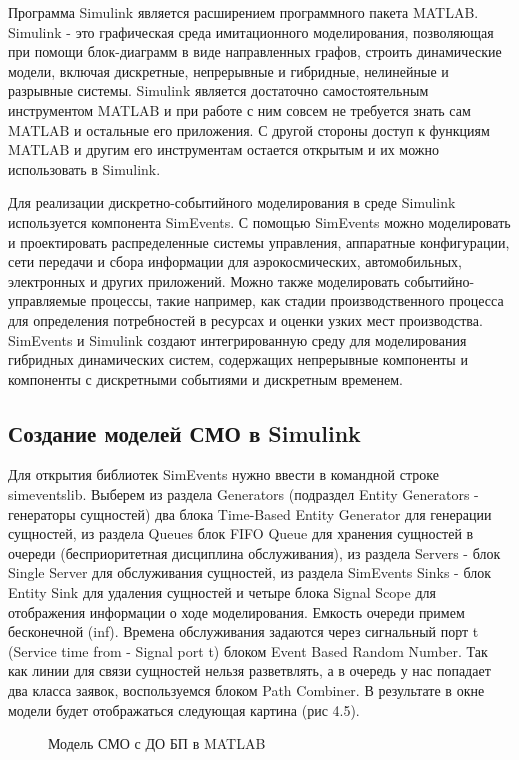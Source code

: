 \documentclass[a4paper,14pt]{report} %
\begin{document}
Программа Simulink является расширением программного пакета MATLAB. Simulink - это графическая среда имитационного моделирования, позволяющая при помощи блок-диаграмм в виде направленных графов, строить динамические модели, включая дискретные, непрерывные и гибридные, нелинейные и разрывные системы. Simulink является достаточно самостоятельным инструментом MATLAB и при работе с ним совсем не требуется знать сам MATLAB и остальные его приложения. С другой стороны доступ к функциям MATLAB и другим его инструментам остается открытым и их можно использовать в Simulink. 

Для реализации дискретно-событийного моделирования в среде Simulink используется компонента SimEvents. С помощью SimEvents можно моделировать и проектировать распределенные системы управления, аппаратные конфигурации, сети передачи и сбора информации для аэрокосмических, автомобильных, электронных и других приложений. Можно также моделировать событийно-управляемые процессы, такие например, как стадии производственного процесса для определения потребностей в ресурсах и оценки узких мест производства. SimEvents и Simulink создают интегрированную среду для моделирования гибридных динамических систем, содержащих непрерывные компоненты и компоненты с дискретными событиями и дискретным временем. 

\subsection{Создание моделей СМО в Simulink}
Для открытия библиотек SimEvents нужно ввести в командной строке simeventslib. Выберем из раздела Generators (подраздел Entity Generators - генераторы сущностей) два блока Time-Based Entity Generator для генерации сущностей, из раздела Queues блок FIFO Queue для хранения сущностей в очереди (бесприоритетная дисциплина обслуживания), из раздела Servers - блок Single Server для обслуживания сущностей, из раздела SimEvents Sinks - блок Entity Sink для удаления сущностей и четыре блока Signal Scope для отображения информации о ходе моделирования. Емкость очереди примем бесконечной (inf). Времена обслуживания задаются через сигнальный порт t (Service time from - Signal port t) блоком Event Based Random Number. Так как линии для связи сущностей нельзя разветвлять, а в очередь у нас попадает два класса заявок, воспользуемся блоком Path Combiner. В результате в окне модели будет отображаться следующая картина (рис 4.5).
\begin{figure}[h] %
\caption{Модель СМО с ДО БП в MATLAB}
\label{ris:matlab_fifo}
\end{figure} %
\end{document}

